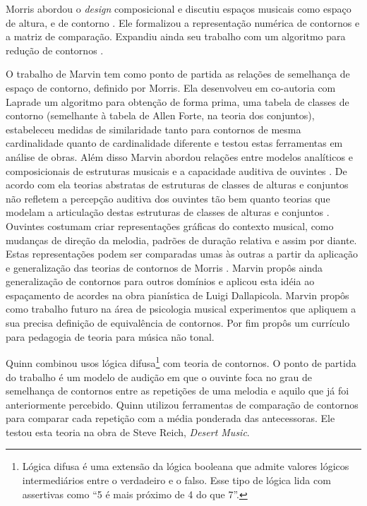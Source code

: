 \documentclass[12pt]{article}
\newcommand{\eng}[1]{\textit{#1}}
\newcommand{\opus}[1]{\textit{#1}}
\begin{document}

Morris abordou o \eng{design} composicional e discutiu espaços
musicais como espaço de altura, e de contorno
\cite{morris87:composition}. Ele formalizou a representação numérica
de contornos e a matriz de comparação. Expandiu ainda seu trabalho com
um algoritmo para redução de contornos \cite{morris93:directions}.


O trabalho de Marvin tem como ponto de partida as relações de
semelhança de espaço de contorno, definido por Morris. Ela desenvolveu
em co-autoria com Laprade \cite{marvin.ea87:relating} um algoritmo
para obtenção de forma prima, uma tabela de classes de contorno
(semelhante à tabela de Allen Forte, na teoria dos conjuntos),
estabeleceu medidas de similaridade tanto para contornos de mesma
cardinalidade quanto de cardinalidade diferente e testou estas
ferramentas em análise de obras. Além disso Marvin abordou relações
entre modelos analíticos e composicionais de estruturas musicais e a
capacidade auditiva de ouvintes \cite{marvin88:generalized}. De acordo
com ela teorias abstratas de estruturas de classes de alturas e
conjuntos não refletem a percepção auditiva dos ouvintes tão bem
quanto teorias que modelam a articulação destas estruturas de classes
de alturas e conjuntos \cite[p. 228]{marvin88:generalized}. Ouvintes
costumam criar representações gráficas do contexto musical, como
mudanças de direção da melodia, padrões de duração relativa e assim
por diante. Estas representações podem ser comparadas umas às outras a
partir da aplicação e generalização das teorias de contornos de Morris
\cite[p. 229]{marvin88:generalized}. Marvin propôs ainda generalização
de contornos para outros domínios e aplicou esta idéia ao espaçamento
de acordes na obra pianística de Luigi Dallapicola. Marvin propôs como
trabalho futuro na área de psicologia musical experimentos que
apliquem a sua precisa definição de equivalência de contornos. Por fim
propôs um currículo para pedagogia de teoria para música não tonal.



Quinn \cite{quinn97:fuzzy} combinou usos lógica difusa\footnote{Lógica
  difusa é uma extensão da lógica booleana que admite valores lógicos
  intermediários entre o verdadeiro e o falso. Esse tipo de lógica
  lida com assertivas como ``5 é mais próximo de 4 do que 7''.} com
teoria de contornos. O ponto de partida do trabalho é um modelo de
audição em que o ouvinte foca no grau de semelhança de contornos entre
as repetições de uma melodia e aquilo que já foi anteriormente
percebido. Quinn utilizou ferramentas de comparação de contornos para
comparar cada repetição com a média ponderada das antecessoras. Ele
testou esta teoria na obra de Steve Reich, \opus{Desert Music}.
\end{document}
